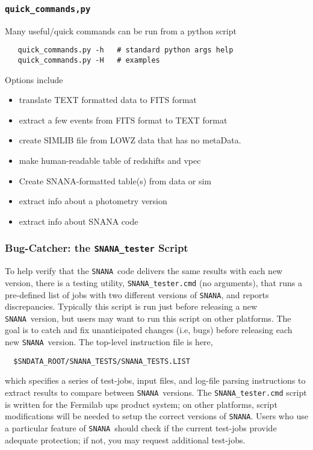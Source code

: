 \documentclass[12pt]{article}
\newcommand{\snana}{{\tt SNANA}}
\begin{document}
{%
  \subsubsection{{\tt quick\_commands,py}}
   \label{sss:quick_commands}

Many useful/quick commands can be run from a python script
\begin{verbatim}
   quick_commands.py -h   # standard python args help
   quick_commands.py -H   # examples
\end{verbatim}
Options include
\vspace{-0.3cm}
\begin{itemize}[noitemsep]
   \item translate TEXT formatted data to FITS format
   \item extract a few events from FITS format to TEXT format
   \item create SIMLIB file from LOWZ data that has no metaData.
   \item make human-readable table of redshifts and vpec
   \item Create SNANA-formatted table(s) from data or sim
   \item extract info about a photometry version
   \item extract info about SNANA code
\end{itemize}

  \subsubsection{Bug-Catcher: the {\tt SNANA\_tester} Script }
  \label{sss:SNANA_tester}

To help verify that the \snana\ code delivers the same
results with each new version, there is a testing utility,
{\tt SNANA\_tester.cmd} (no arguments), that runs a pre-defined
list of jobs with two different versions of \snana,
and reports discrepancies. Typically this script is run
just before releasing a new \snana\ version, but users may
want to run this script on other platforms.
The goal is to catch and fix unanticipated changes (i.e, bugs)
before releasing each new \snana\ version.
The top-level instruction file is here,
%
\begin{verbatim}
  $SNDATA_ROOT/SNANA_TESTS/SNANA_TESTS.LIST
\end{verbatim}
%
which specifies a series of test-jobs, input files,
and log-file parsing instructions to extract results
to compare between \snana\ versions.
The {\tt SNANA\_tester.cmd} script is written for the 
Fermilab ups product system;
on other platforms, script modifications will be needed
to setup the correct versions of \snana.
Users who use a particular feature of \snana\ should check
if the current test-jobs provide adequate protection;
if not, you may request additional test-jobs.


}
\end{document}

